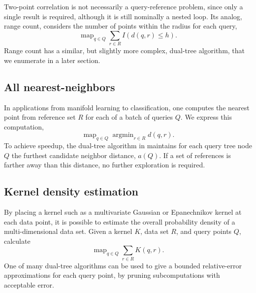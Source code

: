 \documentclass[twoside,leqno,twocolumn]{article}
\DeclareMathOperator*{\map}{map}
\DeclareMathOperator*{\argmin}{argmin}
\newcommand{\mysub}[1]{\subsection{#1} }
\begin{document}
Two-point correlation is not necessarily a query-reference problem, since only a single result is required, although it is still nominally a nested loop.
Its analog, range count, considers the number of points within the radius for each query,
\[\map_{q \in Q} \sum_{r \in R} I(d(q, r) \leq h).\]
Range count has a similar, but slightly more complex, dual-tree algorithm, that we enumerate in a later section.

\mysub{All nearest-neighbors}
In applications from manifold learning to classification, one computes the nearest point from reference set $R$ for each of a batch of queries $Q$.
We express this computation,
\[\map_{q \in Q} \argmin_{r \in R} d(q,r).\]
\noindent To achieve speedup, the dual-tree algorithm in \cite{ryan_nips} maintains for each query tree node $Q$ the furthest candidate neighbor distance, $a(Q)$.
If a set of references is farther away than this distance, no further exploration is required.

\mysub{Kernel density estimation}
By placing a kernel such as a multivariate Gaussian or Epanechnikov kernel at each data point, it is possible to estimate the overall probability density of a multi-dimensional data set.
Given a kernel $K$, data set $R$, and query points $Q$, calculate
\[\map_{q \in Q} \sum_{r \in R} K(q, r).\]
One of many dual-tree algorithms \cite{gray_kde, lee_gauss1, lee_gauss2} can be used to give a bounded relative-error approximations for each query point, by pruning subcomputations with acceptable error.
\end{document}
